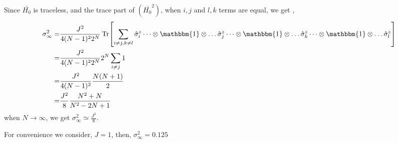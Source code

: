 \documentclass[a4paper,11pt]{article}
\begin{document}
Since $\bar{H_0}$ is traceless, and the trace part of $\left(\bar{H_0}^2\right)$, when $i,j$ and $l,k$ terms are equal, we get ,
\begin{align*}
\sigma_\infty^2 =& \frac{J^2}{4(N-1)^2 2^N}\Tr[\sum_{i\neq j, k \neq l} \hat{\sigma}^z_i \dots\otimes \mathbbm{1} \otimes \dots \hat{\sigma}^z_j \dots\otimes \mathbbm{1} \otimes \dots \hat{\sigma}^z_k\dots\otimes \mathbbm{1} \otimes \dots \hat{\sigma}^z_l ]\\
=& \frac{J^2}{4(N-1)^2 2^N} 2^N \sum_{i\neq j} 1\\
=& \frac{J^2}{4(N-1)^2} \frac{N(N+1)}{2}\\
=& \frac{J^2}{8} \frac{N^2+N}{N^2-2N+1}
\end{align*}
when $N\rightarrow \infty$, we get $\displaystyle \sigma_\infty^2 \simeq \frac{J^2}{8}$. 

For convenience we consider, $J=1$, then, $\sigma_\infty^2 = 0.125$ 
\end{document}
